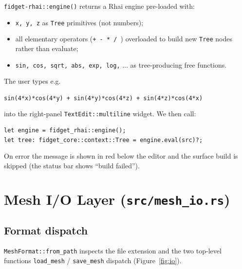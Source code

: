 \documentclass[11pt]{article}
\begin{document}
\texttt{fidget-rhai::engine()} returns a Rhai engine pre-loaded with:
\begin{itemize}[leftmargin=2em]
  \item \texttt{x, y, z} as \lstinline|Tree| primitives (not numbers);
  \item all elementary operators (\verb|+ - * / |) overloaded to build
        new \lstinline|Tree| nodes rather than evaluate;
  \item \texttt{sin, cos, sqrt, abs, exp, log,} $\ldots$ as
        tree-producing free functions.
\end{itemize}
The user types e.g.
\begin{center}\lstinline|sin(4*x)*cos(4*y) + sin(4*y)*cos(4*z) + sin(4*z)*cos(4*x)|\end{center}
into the right-panel \texttt{TextEdit::multiline} widget.  We then
call:
\begin{lstlisting}
let engine = fidget_rhai::engine();
let tree: fidget_core::context::Tree = engine.eval(src)?;
\end{lstlisting}
On error the message is shown in red below the editor and the surface
build is skipped (the status bar shows ``build failed'').

\section{Mesh I/O Layer (\texttt{src/mesh\_io.rs})}

\subsection{Format dispatch}

\lstinline|MeshFormat::from_path| inspects the file extension and the
two top-level functions \lstinline|load_mesh| / \lstinline|save_mesh|
dispatch (Figure~\ref{fig:io}).
\end{document}
